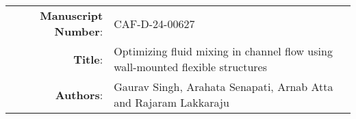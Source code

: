 \documentclass[onecolumn,a4paper,amsmath,amssym,pre]{revtex4}
\begin{document}
    

\begin{tabular}{ r | l }
  \hline            
   \textbf{Manuscript Number}:& CAF-D-24-00627 \\	
   \textbf{Title}: & Optimizing fluid mixing in channel flow using wall-mounted flexible structures\\
  \textbf{Authors}:  & Gaurav Singh, Arahata Senapati, Arnab Atta and Rajaram Lakkaraju \\
  \hline  
\end{tabular}\\ \\



	
\end{document}
